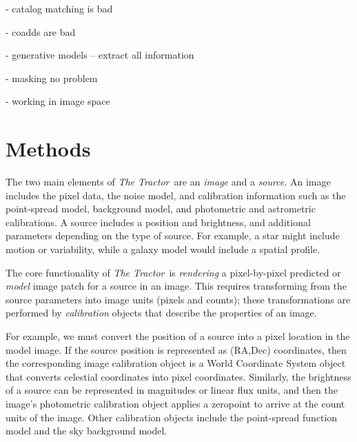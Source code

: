 \documentclass[linenumbers]{aastex631}
\newcommand{\thetractor}{\emph{The Tractor}}
\begin{document}
- catalog matching is bad

- coadds are bad

- generative models -- extract all information

- masking no problem

- working in image space

\cite{2009AJ....137.4400L}

\section{Methods}


The two main elements of \thetractor\ are an \emph{image} and a
\emph{source}.  An image includes the pixel data, the noise model, and
calibration information such as the point-spread model, background
model, and photometric and astrometric calibrations.  A source
includes a position and brightness, and additional parameters
depending on the type of source.  For example, a star might include
motion or variability, while a galaxy model would include a spatial
profile.


The core functionality of \thetractor\ is \emph{rendering} a
pixel-by-pixel predicted or \emph{model} image patch for a source in
an image.  This requires transforming from the source parameters into
image units (pixels and counts); these transformations are performed
by \emph{calibration} objects that describe the properties of an
image.

For example, we must convert the position of a source into a pixel
location in the model image.  If the source position is represented as
(RA,Dec) coordinates, then the corresponding image calibration object
is a World Coordinate System object that converts celestial
coordinates into pixel coordinates.  Similarly, the brightness of a
source can be represented in magnitudes or linear flux units, and then
the image's photometric calibration object applies a zeropoint to
arrive at the count units of the image.  Other calibration objects
include the point-spread function model and the sky background model.
\end{document}
